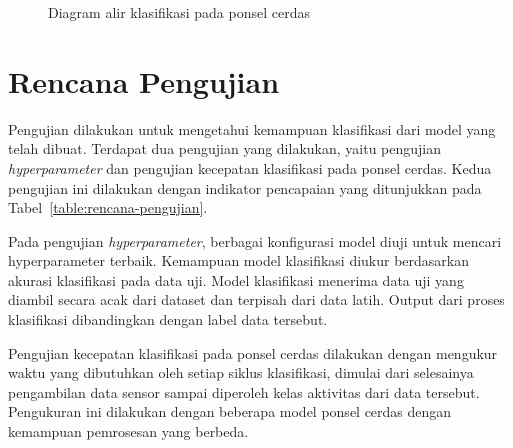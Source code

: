 \begin{figure}[h]
    \centering
    \caption{Diagram alir klasifikasi pada ponsel cerdas}
    \label{gambar:diagram-alir-klasifikasi-ponsel-cerdas}
\end{figure}

%
\section{Rencana Pengujian}
Pengujian dilakukan untuk mengetahui kemampuan klasifikasi dari model yang telah dibuat. Terdapat dua pengujian yang dilakukan, yaitu pengujian \textit{hyperparameter} dan pengujian kecepatan klasifikasi pada ponsel cerdas. Kedua pengujian ini dilakukan dengan indikator pencapaian yang ditunjukkan pada Tabel~\ref{table:rencana-pengujian}.

Pada pengujian \textit{hyperparameter}, berbagai konfigurasi model diuji untuk mencari hyperparameter terbaik. Kemampuan model klasifikasi diukur berdasarkan akurasi klasifikasi pada data uji. Model klasifikasi menerima data uji yang diambil secara acak dari dataset dan terpisah dari data latih. Output dari proses klasifikasi dibandingkan dengan label data tersebut.

Pengujian kecepatan klasifikasi pada ponsel cerdas dilakukan dengan mengukur waktu yang dibutuhkan oleh setiap siklus klasifikasi, dimulai dari selesainya pengambilan data sensor sampai diperoleh kelas aktivitas dari data tersebut. Pengukuran ini dilakukan dengan beberapa model ponsel cerdas dengan kemampuan pemrosesan yang berbeda.

